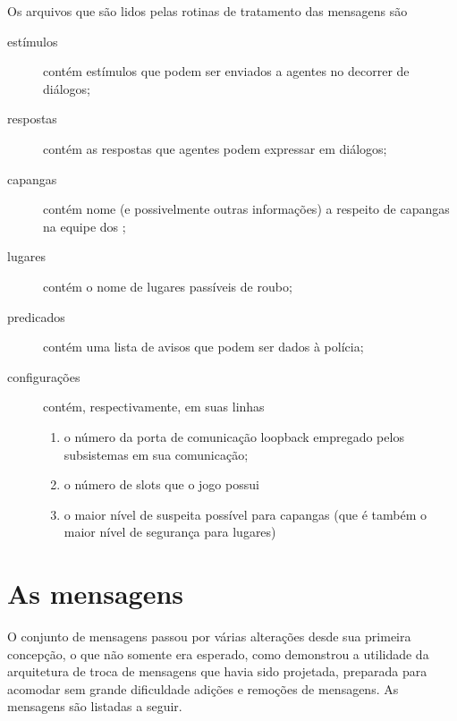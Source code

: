 Os arquivos que são lidos pelas rotinas de tratamento das mensagens são
\begin{description}
\item[estímulos] contém estímulos que podem ser enviados a agentes no decorrer de diálogos;
\item[respostas] contém as respostas que agentes podem expressar em diálogos;
\item[capangas] contém nome (e possivelmente outras informações) a respeito de capangas na equipe dos \nomeGrupo;
\item[lugares] contém o nome de lugares passíveis de roubo;
\item[predicados] contém uma lista de avisos que podem ser dados à polícia;
\item[configurações] contém, respectivamente, em suas linhas
\begin{enumerate}
\item o número da porta de comunicação loopback empregado pelos subsistemas em sua comunicação;
\item o número de slots que o jogo possui
\item o maior nível de suspeita possível para capangas (que é também o maior nível de segurança para lugares)
\end{enumerate}
\end{description}

\section{As mensagens}

O conjunto de mensagens passou por várias alterações desde sua primeira concepção, o que não somente era esperado, como demonstrou a utilidade da arquitetura de troca de mensagens que havia sido projetada, preparada para acomodar sem grande dificuldade adições e remoções de mensagens. As mensagens são listadas a seguir.

